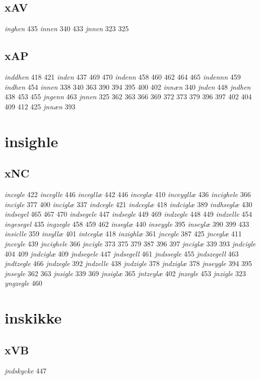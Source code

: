 \documentclass[a4paper,twocolumn]{article}
\begin{document}
\subsection{xAV}
\label{sec:orgf26c148}
\emph{inghen} 435 \emph{innen} 340 433 \emph{jnnen} 323 325 
\subsection{xAP}
\label{sec:org09c3791}
\emph{inddhen} 418 421 \emph{inden} 437 469 470 \emph{indenn} 458 460 462 464 465 \emph{indennn} 459 \emph{indhen} 454 \emph{innen} 338 340 363 390 394 395 400 402 \emph{innæn} 340 \emph{jnden} 448 \emph{jndhen} 438 453 455 \emph{jngenn} 463 \emph{jnnen} 325 362 363 366 369 372 373 379 396 397 402 404 409 412 425 \emph{jnnæn} 393 
\section{insighle}
\label{sec:orgbfadd26}
\subsection{xNC}
\label{sec:orgbe8c95f}
\emph{incegle} 422 \emph{inceglle} 446 \emph{incegllæ} 442 446 \emph{inceglæ} 410 \emph{inceygllæ} 436 \emph{incighele} 366 \emph{incigle} 377 400 \emph{inciglæ} 337 \emph{indcegle} 421 \emph{indceglæ} 418 \emph{indciglæ} 389 \emph{indhseglæ} 430 \emph{indsegel} 465 467 470 \emph{indsegele} 447 \emph{indsegle} 449 469 \emph{indzegle} 448 449 \emph{indzelle} 454 \emph{ingesegel} 435 \emph{ingzegle} 458 459 462 \emph{inseglæ} 440 \emph{inseygle} 395 \emph{inseylæ} 390 399 433 \emph{insiclle} 359 \emph{insyllæ} 401 \emph{intceglæ} 418 \emph{inzighlæ} 361 \emph{jncegle} 387 425 \emph{jnceglæ} 411 \emph{jnceyle} 439 \emph{jncighele} 366 \emph{jncigle} 373 375 379 387 396 397 \emph{jnciglæ} 339 393 \emph{jndcigle} 404 409 \emph{jndciglæ} 409 \emph{jndsegele} 447 \emph{jndsegell} 461 \emph{jndssegle} 455 \emph{jndszegell} 463 \emph{jndtzegle} 466 \emph{jndzegle} 392 \emph{jndzelle} 438 \emph{jndzigle} 378 \emph{jndziglæ} 378 \emph{jnseygle} 394 395 \emph{jnseyle} 362 363 \emph{jnsigle} 339 369 \emph{jnsiglæ} 365 \emph{jntzeylæ} 402 \emph{jnzegle} 453 \emph{jnzigle} 323 \emph{yngzegle} 460 
\section{inskikke}
\label{sec:org45b7698}
\subsection{xVB}
\label{sec:orgccfd9e7}
\emph{jndskycke} 447 
\end{document}
